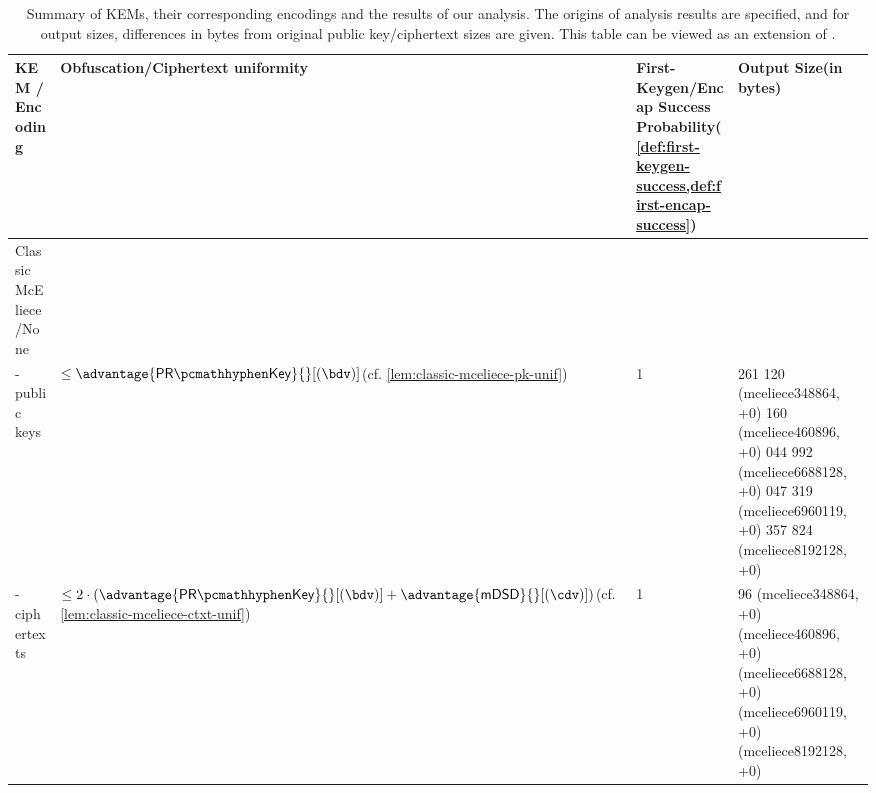 \begin{table}
    \centering
    \tiny\raggedright
    \begin{tabular}{@{} L{0.2\textwidth-\tabcolsep} | L{0.35\tabcolsep} L{0.2\tabcolsep} L{0.25\textwidth-\tabcolsep} @{}}
        \textbf{KEM /\newline Encoding} & \textbf{Obfuscation/Ciphertext uniformity} & \textbf{First-Keygen/Encap Success Probability}\newline (\cref{def:first-keygen-success,def:first-encap-success}) & \textbf{Output Size}\newline (in bytes)\\ \hline
        Classic McEliece \cite{NISTPQC-R4:ClassicMcEliece22} /\newline None & \rule{0pt}{1.2em} &  & \\
        - public keys & $\leq \advantage{\prkey}{}[(\bdv)]$\newline (cf. \cref{lem:classic-mceliece-pk-unif})
         & 1
         & 261 120 (\textsf{mceliece348864}, +0) 160 (\textsf{mceliece460896}, +0) 044 992 (\textsf{mceliece6688128}, +0) 047 319 (\textsf{mceliece6960119}, +0) 357 824 (\textsf{mceliece8192128}, +0)\newline \\
        - ciphertexts & $\leq 2 \cdot \left( \advantage{\prkey}{}[(\bdv)] + \advantage{\mdsd}{}[(\cdv)] \right)$\newline (cf. \cref{lem:classic-mceliece-ctxt-unif})
         & 1
         & 96 (\textsf{mceliece348864}, +0) (\textsf{mceliece460896}, +0) (\textsf{mceliece6688128}, +0) (\textsf{mceliece6960119}, +0) (\textsf{mceliece8192128}, +0)\newline \\
    \end{tabular}
    \caption{Summary of KEMs, their corresponding encodings and the results of our analysis. The origins of analysis results are specified, and for output sizes, differences in bytes from original public key/ciphertext sizes are given. This table can be viewed as an extension of \cite[Table~2]{CCS:GunSteVei24}.}
    \label{tab:obfuscation-summary}
\end{table}

